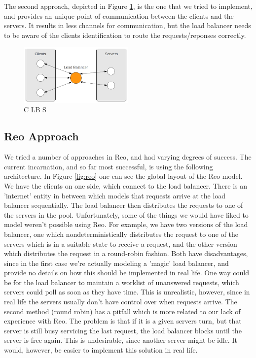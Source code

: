 \documentclass[a4paper]{article}
\newcommand{\re}{Reo\xspace}
\begin{document}
The second approach, depicted in Figure \ref{fig:clbs}, is the one that we
tried to implement, and provides an unique point of communication between the
clients and the servers. It results in less channels for communication, but the
load balancer needs to be aware of the clients identification to route the
requests/reponses correctly.

\begin{figure}[htb]
	\begin{center}
		\includegraphics[width=0.5\textwidth]{images/c_lb_s.png}
	\end{center}
	\caption{C LB S}
	\label{fig:clbs}
\end{figure}



\subsection{\re Approach}

We tried a number of approaches in \re, and had varying degrees of success. The
current incarnation, and so far most successful, is using the following
architecture. In Figure \ref{fig:reo} one can see the global layout of the \re
model. We have the clients on one side, which connect to the load balancer.
There is an 'internet' entity in between which models that requests arrive at
the load balancer sequentially. The load balancer then distributes the requests
to one of the servers in the pool. Unfortunately, some of the things we would
have liked to model weren't possible using \re. For example, we have two
versions of the load balancer, one which nondeterministically distributes the
request to one of the servers which is in a suitable state to receive a request,
and the other version which distributes the request in a round-robin fashion.
Both have disadvantages, since in the first case we're actually modeling a
'magic' load balancer, and provide no details on how this should be implemented
in real life. One way could be for the load balancer to maintain a worklist of
unanswered requests, which servers could poll as soon as they have time. This is
unrealistic, however, since in real life the servers usually don't have control
over when requests arrive. The second method (round robin) has a pitfall which
is more related to our lack of experience with \re. The problem is that if it is a
given servers turn, but that server is still busy servicing the last request,
the load balancer blocks until the server is free again. This is undesirable,
since another server might be idle. It would, however, be easier to implement
this solution in real life.
\end{document}
